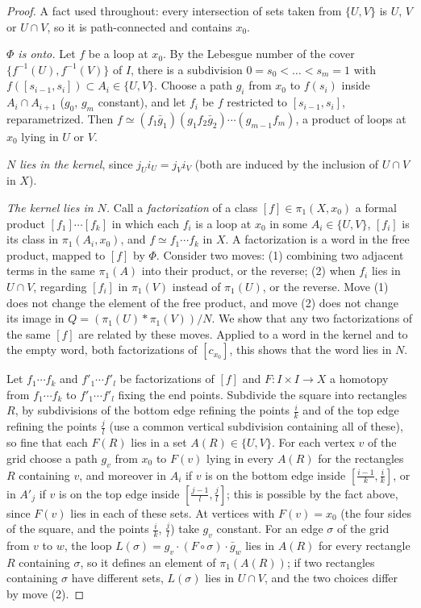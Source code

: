 \begin{proof}
A fact used throughout: every intersection of sets taken from $\{U,V\}$ is $U$, $V$ or $U\cap V$, so it is path-connected and contains $x_0$.

\emph{$\Phi$ is onto.} Let $f$ be a loop at $x_0$. By the Lebesgue number of the cover $\{f^{-1}(U),f^{-1}(V)\}$ of $I$, there is a subdivision $0=s_0<\dots<s_m=1$ with $f([s_{i-1},s_i])\subset A_i\in\{U,V\}$.
Choose a path $g_i$ from $x_0$ to $f(s_i)$ inside $A_i\cap A_{i+1}$ ($g_0$, $g_m$ constant), and let $f_i$ be $f$ restricted to $[s_{i-1},s_i]$, reparametrized. Then
$f\simeq(f_1\bar g_1)(g_1f_2\bar g_2)\cdots(g_{m-1}f_m)$, a product of loops at $x_0$ lying in $U$ or $V$.

\emph{$N$ lies in the kernel}, since $j_Ui_U=j_Vi_V$ (both are induced by the inclusion of $U\cap V$ in $X$).

\emph{The kernel lies in $N$.} Call a \emph{factorization} of a class $[f]\in\pi_1(X,x_0)$ a formal product $[f_1]\cdots[f_k]$ in which each $f_i$ is a loop at $x_0$ in some $A_i\in\{U,V\}$, $[f_i]$ is its
class in $\pi_1(A_i,x_0)$, and $f\simeq f_1\cdots f_k$ in $X$. A factorization is a word in the free product, mapped to $[f]$ by $\Phi$. Consider two moves: (1) combining two adjacent terms in the
same $\pi_1(A)$ into their product, or the reverse; (2) when $f_i$ lies in $U\cap V$, regarding $[f_i]$ in $\pi_1(V)$ instead of $\pi_1(U)$, or the reverse. Move (1) does not change the element of
the free product, and move (2) does not change its image in $Q=(\pi_1(U)\ast\pi_1(V))/N$. We show that any two factorizations of the same $[f]$ are related by these moves. Applied to a
word in the kernel and to the empty word, both factorizations of $[c_{x_0}]$, this shows that the word lies in $N$.

Let $f_1\cdots f_k$ and $f'_1\cdots f'_l$ be factorizations of $[f]$ and $F\colon I\times I\to X$ a homotopy from $f_1\cdots f_k$ to $f'_1\cdots f'_l$ fixing the end points. Subdivide the square into rectangles $R$, by
subdivisions of the bottom edge refining the points $\frac ik$ and of the top edge refining the points $\frac jl$ (use a common vertical subdivision containing all of these), so fine that each
$F(R)$ lies in a set $A(R)\in\{U,V\}$. For each vertex $v$ of the grid choose a path $g_v$ from $x_0$ to $F(v)$ lying in every $A(R)$ for the rectangles $R$ containing $v$, and moreover in
$A_i$ if $v$ is on the bottom edge inside $[\frac{i-1}k,\frac ik]$, or in $A'_j$ if $v$ is on the top edge inside $[\frac{j-1}l,\frac jl]$; this is possible by the fact above, since $F(v)$ lies in each of these sets.
At vertices with $F(v)=x_0$ (the four sides of the square, and the points $\frac ik$, $\frac jl$) take $g_v$ constant. For an edge $\sigma$ of the grid from $v$ to $w$, the loop
$L(\sigma)=g_v\cdot(F\circ\sigma)\cdot\bar g_w$ lies in $A(R)$ for every rectangle $R$ containing $\sigma$, so it defines an element of $\pi_1(A(R))$; if two rectangles containing $\sigma$ have different sets, $L(\sigma)$ lies
in $U\cap V$, and the two choices differ by move (2).


\end{proof}

